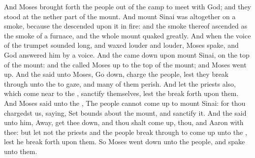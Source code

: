 \begin{biblechapter}
\verse And Moses brought forth the people out of the camp to meet with God; and they stood at the nether part of the mount.
\verse And mount Sinai was altogether on a smoke, because the \LORD descended upon it in fire: and the smoke thereof ascended as the smoke of a furnace, and the whole mount quaked greatly.
\verse And when the voice of the trumpet sounded long, and waxed louder and louder, Moses spake, and God answered him by a voice.
\verse And the \LORD came down upon mount Sinai, on the top of the mount: and the \LORD called Moses up to the top of the mount; and Moses went up.
\verse And the \LORD said unto Moses, Go down, charge the people, lest they break through unto the \LORD to gaze, and many of them perish.
\verse And let the priests also, which come near to the \LORD, sanctify themselves, lest the \LORD break forth upon them.
\verse And Moses said unto the \LORD, The people cannot come up to mount Sinai: for thou chargedst us, saying, Set bounds about the mount, and sanctify it.
\verse And the \LORD said unto him, Away, get thee down, and thou shalt come up, thou, and Aaron with thee: but let not the priests and the people break through to come up unto the \LORD, lest he break forth upon them.
\verse So Moses went down unto the people, and spake unto them.
\end{biblechapter}


